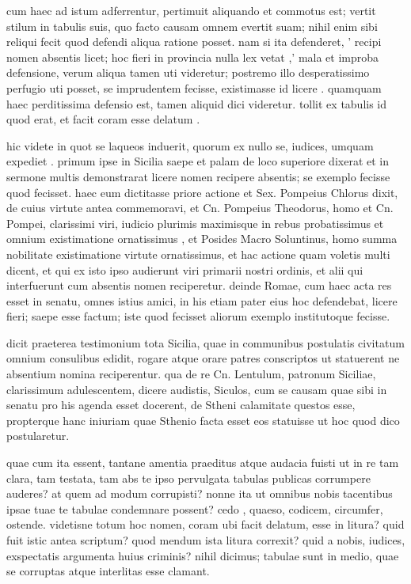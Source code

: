  cum haec ad istum adferrentur, pertimuit aliquando et commotus est; vertit stilum in tabulis suis, quo facto causam omnem evertit suam; nihil enim sibi reliqui fecit quod defendi aliqua ratione posset. nam si ita defenderet, ' recipi nomen absentis licet; hoc fieri in provincia nulla lex vetat ,' mala et improba defensione, verum aliqua tamen uti videretur; postremo illo desperatissimo perfugio uti posset, se imprudentem fecisse, existimasse id licere . quamquam haec perditissima defensio est, tamen aliquid dici videretur. tollit ex tabulis id quod erat, et facit coram esse delatum .

 hic videte in quot se laqueos induerit, quorum ex nullo se, iudices, umquam expediet . primum ipse in Sicilia saepe et palam de loco superiore dixerat et in sermone multis demonstrarat licere nomen recipere absentis; se exemplo fecisse quod fecisset. haec eum dictitasse priore actione et Sex. Pompeius Chlorus dixit, de cuius virtute antea commemoravi, et Cn. Pompeius Theodorus, homo et Cn. Pompei, clarissimi viri, iudicio plurimis maximisque in rebus probatissimus et omnium existimatione ornatissimus , et Posides Macro Soluntinus, homo summa nobilitate existimatione virtute ornatissimus, et hac actione quam voletis multi dicent, et qui ex isto ipso audierunt viri primarii nostri ordinis, et alii qui interfuerunt cum absentis nomen reciperetur. deinde Romae, cum haec acta res esset in senatu, omnes istius amici, in his etiam pater eius hoc defendebat, licere fieri; saepe esse factum; iste quod fecisset aliorum exemplo institutoque fecisse.

 dicit praeterea testimonium tota Sicilia, quae in communibus postulatis civitatum omnium consulibus edidit, rogare atque orare patres conscriptos ut statuerent ne absentium nomina reciperentur. qua de re Cn. Lentulum, patronum Siciliae, clarissimum adulescentem, dicere audistis, Siculos, cum se causam quae sibi in senatu pro his agenda esset docerent, de Stheni calamitate questos esse, propterque hanc iniuriam quae Sthenio facta esset eos statuisse ut hoc quod dico postularetur.

 quae cum ita essent, tantane amentia praeditus atque audacia fuisti ut in re tam clara, tam testata, tam abs te ipso pervulgata tabulas publicas corrumpere auderes? at quem ad modum corrupisti? nonne ita ut omnibus nobis tacentibus ipsae tuae te tabulae condemnare possent? cedo , quaeso, codicem, circumfer, ostende. videtisne totum hoc nomen, coram ubi facit delatum, esse in litura? quid fuit istic antea scriptum? quod mendum ista litura correxit? quid a nobis, iudices, exspectatis argumenta huius criminis? nihil dicimus; tabulae sunt in medio, quae se corruptas atque interlitas esse clamant.

